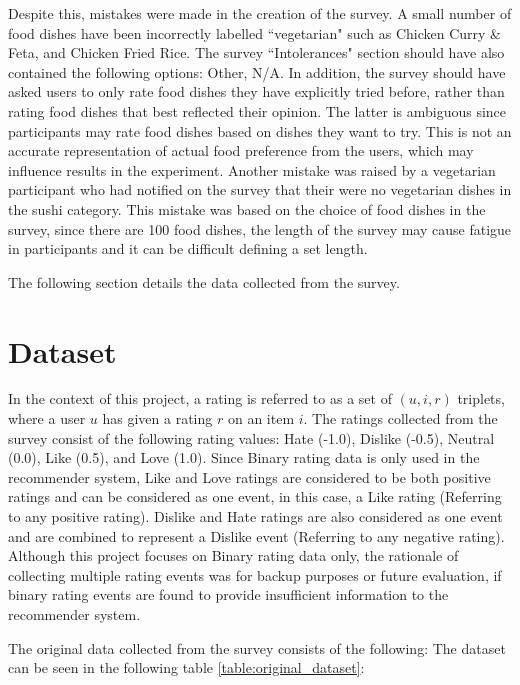 Despite this, mistakes were made in the creation of the survey. A small number of food dishes have been incorrectly labelled ``vegetarian" such as Chicken Curry \& Feta, and Chicken Fried Rice. The survey ``Intolerances" section should have also contained the following options: Other, N/A. In addition, the survey should have asked users to only rate food dishes they have explicitly tried before, rather than rating food dishes that best reflected their opinion. The latter is ambiguous since participants may rate food dishes based on dishes they want to try. This is not an accurate representation of actual food preference from the users, which may influence results in the experiment. Another mistake was raised by a vegetarian participant who had notified on the survey that their were no vegetarian dishes in the sushi category. This mistake was based on the choice of food dishes in the survey, since there are 100 food dishes, the length of the survey may cause fatigue in participants and it can be difficult defining a set length.   

The following section details the data collected from the survey. 

\section{Dataset} \label{dataset}

In the context of this project, a rating is referred to as a set of $(u, i, r)$ triplets, where a user $u$ has given a rating $r$ on an item $i$. 
The ratings collected from the survey consist of the following rating values: Hate (-1.0), Dislike (-0.5), Neutral (0.0), Like (0.5), and Love (1.0). Since Binary rating data is only used in the recommender system, Like and Love ratings are considered to be both positive ratings and can be considered as one event, in this case, a Like rating (Referring to any positive rating). Dislike and Hate ratings are also considered as one event and are combined to represent a Dislike event (Referring to any negative rating). Although this project focuses on Binary rating data only, the rationale of collecting multiple rating events was for backup purposes or future evaluation, if binary rating events are found to provide insufficient information to the recommender system. 

The original data collected from the survey consists of the following:
The dataset can be seen in the following table \ref{table:original_dataset}:

